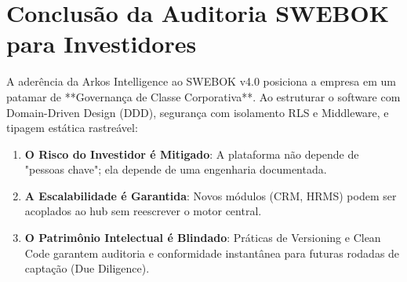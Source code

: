 \section{Conclusão da Auditoria SWEBOK para Investidores}
A aderência da Arkos Intelligence ao SWEBOK v4.0 posiciona a empresa em um patamar de **Governança de Classe Corporativa**. Ao estruturar o software com Domain-Driven Design (DDD), segurança com isolamento RLS e Middleware, e tipagem estática rastreável:

\begin{enumerate}
    \item \textbf{O Risco do Investidor é Mitigado}: A plataforma não depende de "pessoas chave"; ela depende de uma engenharia documentada.
    \item \textbf{A Escalabilidade é Garantida}: Novos módulos (CRM, HRMS) podem ser acoplados ao hub sem reescrever o motor central.
    \item \textbf{O Patrimônio Intelectual é Blindado}: Práticas de Versioning e Clean Code garantem auditoria e conformidade instantânea para futuras rodadas de captação (Due Diligence).
\end{enumerate}
